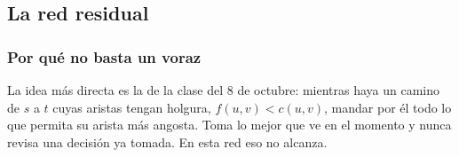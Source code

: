 \documentclass[11pt,letterpaper]{article}
\begin{document}

\subsection*{La red residual}

\subsubsection*{Por qué no basta un voraz}

La idea más directa es la de la clase del 8 de octubre: mientras haya
un camino de $s$ a $t$ cuyas aristas tengan holgura,
$f(u, v) < c(u, v)$, mandar por él todo lo que permita su arista más
angosta. Toma lo mejor que ve en el momento y nunca revisa una
decisión ya tomada. En esta red eso no alcanza.
\end{document}

